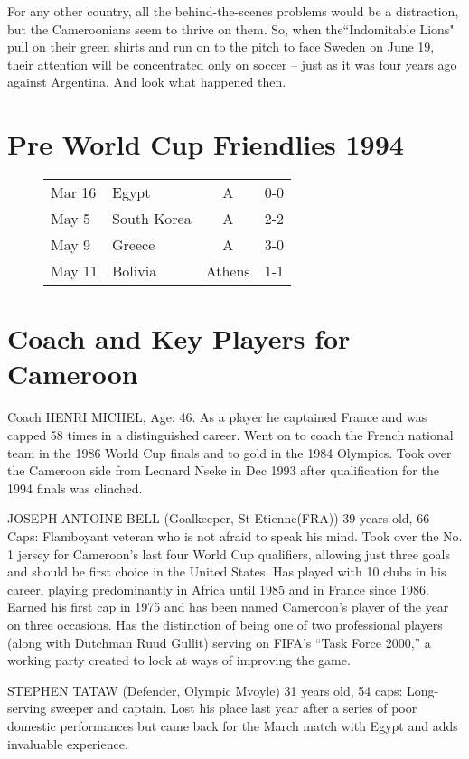 For any other country, all the behind-the-scenes problems would be a distraction, 
but the Cameroonians seem to thrive on them. So, when the``Indomitable Lions" 
pull on their green shirts and run on to the pitch to face Sweden on June 19, 
their attention will be concentrated only on soccer -- just as it was four 
years ago against Argentina. And look what happened then.
\section{Pre World Cup Friendlies 1994}
\begin{figure}[H]
\begin{tabular}{l l c l}
Mar 16 & Egypt & A & 0-0 \\
May 5 & South Korea & A & 2-2 \\
May 9 & Greece & A & 3-0 \\
May 11 & Bolivia & Athens & 1-1 \\
\end{tabular}
\end{figure}
\section{Coach and Key Players for Cameroon}
Coach HENRI MICHEL, Age: 46. As a player he captained France and was capped 58
times in a distinguished career. Went on to coach the French national team in
the 1986 World Cup finals and to gold in the 1984 Olympics. Took over the
Cameroon side from Leonard Nseke in Dec 1993 after qualification for the 1994
finals was clinched.

JOSEPH-ANTOINE BELL (Goalkeeper, St Etienne(FRA)) 39 years old, 66 Caps:
Flamboyant veteran who is not afraid to speak his mind. Took over the No. 1 
jersey for Cameroon's last four World Cup qualifiers, allowing just three goals 
and should be first choice in the United States. Has played with 10 clubs in 
his career, playing predominantly in Africa until 1985 and in France since 1986. 
Earned his first cap in 1975 and has been named Cameroon's player of the year 
on three occasions. Has the distinction of being one of two professional players 
(along with Dutchman Ruud Gullit) serving on FIFA's ``Task Force 2000,'' a 
working party created to look at ways of improving the game.

STEPHEN TATAW (Defender, Olympic Mvoyle) 31 years old, 54 caps:
Long-serving sweeper and captain. Lost his place last year after a series of 
poor domestic performances but came back for the March match with Egypt and 
adds invaluable experience.

